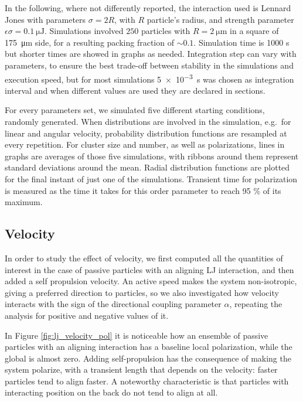 \documentclass[../../master_thesis_np.tex]{subfiles}
\begin{document}
		In the following, where not differently reported, the interaction used is Lennard Jones with parameters $\sigma = 2R$, with $R$ particle's radius, and strength parameter $\epsilon \sigma = \SI{0.1}{\micro\joule}$.
		Simulations involved $250$ particles with $R = \SI{2}{\um}$ in a square of \SI{175}{\um} side, for a resulting packing fraction of $\sim 0.1$.
		Simulation time is 1000 s but shorter times are showed in graphs as needed.
		Integration step can vary with parameters, to ensure the best trade-off between stability in the simulations and execution speed, but for most simulations \SI{5e-3}{\second} was chosen as integration interval and when different values are used they are declared in sections.
		
		For every parameters set, we simulated five different starting conditions, randomly generated.
		When distributions are involved in the simulation, e.g.\ for linear and angular velocity, probability distribution functions are resampled at every repetition.
		For cluster size and number, as well as polarizations, lines in graphs are averages of those five simulations, with ribbons around them represent standard deviations around the mean.
		{\color{blue} Radial distribution functions are plotted for the final instant of just one of the simulations.}
		Transient time for polarization is measured as the time it takes for this order parameter to reach \num{95} \% of its maximum.
		
		\subsection{Velocity}
		\label{velocity}
		In order to study the effect of velocity, we first computed all the quantities of interest in the case of passive particles with an aligning LJ interaction, and then added a self propulsion velocity. 
		An active speed makes the system non-isotropic, giving a preferred direction to particles, so we also investigated how velocity interacts with the sign of the directional coupling parameter $\alpha$, repeating the analysis for positive and negative values of it.
		
		In Figure \ref{fig:lj_velocity_pol} it is noticeable how an ensemble of passive particles with an aligning interaction has a baseline local polarization, while the global is almost zero. 
		Adding self-propulsion has the consequence of making the system polarize, with a transient length that depends on the velocity: faster particles tend to align faster. 
		A noteworthy characteristic is that particles with interacting position on the back do not tend to align at all.
		
\end{document}
